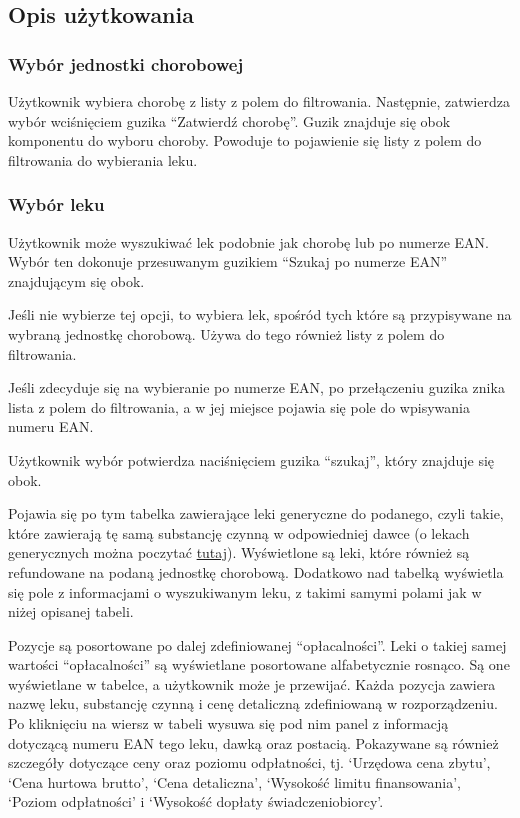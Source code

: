 \documentclass{article}
\begin{document}
    \subsection{Opis użytkowania}
      \subsubsection{Wybór jednostki chorobowej}
        Użytkownik wybiera chorobę z listy z polem do filtrowania.
        Następnie, zatwierdza wybór wciśnięciem guzika ``Zatwierdź chorobę''.
        Guzik znajduje się obok komponentu do wyboru choroby.
        Powoduje to pojawienie się listy z polem do filtrowania do wybierania leku.

      \subsubsection{Wybór leku}
        Użytkownik może wyszukiwać lek podobnie jak chorobę lub po numerze EAN.
        Wybór ten dokonuje przesuwanym guzikiem ``Szukaj po numerze EAN'' znajdującym się obok.

        Jeśli nie wybierze tej opcji, to wybiera lek, spośród tych które są przypisywane na wybraną jednostkę chorobową.
        Używa do tego również listy z polem do filtrowania.

        Jeśli zdecyduje się na wybieranie po numerze EAN, po przełączeniu guzika znika lista z polem do filtrowania,
        a w jej miejsce pojawia się pole do wpisywania numeru EAN.

        Użytkownik wybór potwierdza naciśnięciem guzika ``szukaj'', który znajduje się obok.

        Pojawia się po tym tabelka zawierające leki generyczne do podanego, czyli takie, które zawierają tę samą substancję czynną w odpowiedniej dawce
        (o lekach generycznych można poczytać \href{https://pl.wikipedia.org/wiki/Lek_generyczny}{tutaj}).
        Wyświetlone są leki, które również są refundowane na podaną jednostkę chorobową.
        Dodatkowo nad tabelką wyświetla się pole z informacjami o wyszukiwanym leku, z takimi samymi polami jak w niżej opisanej tabeli.

        Pozycje są posortowane po dalej zdefiniowanej ``opłacalności''.
        Leki o takiej samej wartości ``opłacalności'' są wyświetlane posortowane alfabetycznie rosnąco.
        Są one wyświetlane w tabelce, a użytkownik może je przewijać.
        Każda pozycja zawiera nazwę leku, substancję czynną i cenę detaliczną zdefiniowaną w rozporządzeniu.
        Po kliknięciu na wiersz w tabeli wysuwa się pod nim panel z informacją dotyczącą numeru EAN tego leku, dawką oraz postacią.
        Pokazywane są również szczegóły dotyczące ceny oraz poziomu odpłatności, tj.
        `Urzędowa cena zbytu',
        `Cena hurtowa brutto',
        `Cena detaliczna',
        `Wysokość limitu finansowania',
        `Poziom odpłatności' i
        `Wysokość dopłaty świadczeniobiorcy'.
\end{document}
